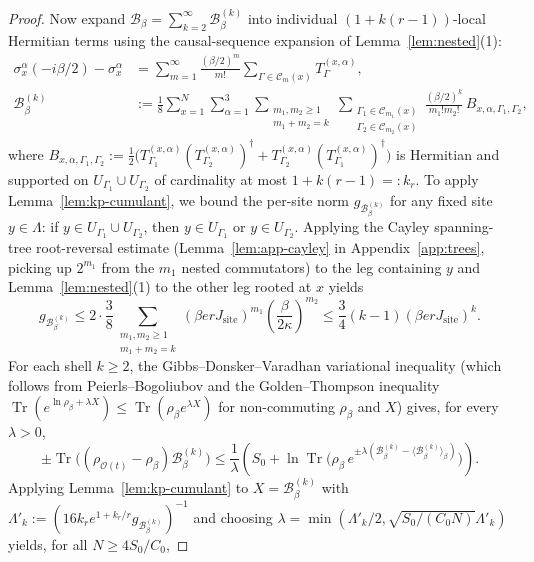 \documentclass[11pt,a4paper]{article}
\numberwithin{equation}{section}
\theoremstyle{plain}
\theoremstyle{definition}
\newcommand{\Tr}{\operatorname{Tr}}
\begin{document}
\begin{proof}
Now expand $\mathcal{B}_\beta = \sum_{k=2}^\infty \mathcal{B}_\beta^{(k)}$ into individual $(1+k(r-1))$-local Hermitian terms using the causal-sequence expansion of Lemma~\ref{lem:nested}(1):
\begin{align*}
  \sigma_x^\alpha(-i\beta/2) - \sigma_x^\alpha &= \sum_{m=1}^\infty \frac{(\beta/2)^m}{m!}\sum_{\Gamma\in\mathcal{C}_m(x)} T_\Gamma^{(x,\alpha)}, \\
  \mathcal{B}_\beta^{(k)} &:= \frac{1}{8}\sum_{x=1}^N\sum_{\alpha=1}^3 \sum_{\substack{m_1,m_2\ge 1\\ m_1+m_2=k}} \sum_{\substack{\Gamma_1\in\mathcal{C}_{m_1}(x)\\ \Gamma_2\in\mathcal{C}_{m_2}(x)}} \frac{(\beta/2)^k}{m_1!m_2!}\,B_{x,\alpha,\Gamma_1,\Gamma_2},
\end{align*}
where $B_{x,\alpha,\Gamma_1,\Gamma_2} := \frac{1}{2}\bigl(T_{\Gamma_1}^{(x,\alpha)}(T_{\Gamma_2}^{(x,\alpha)})^\dagger + T_{\Gamma_2}^{(x,\alpha)}(T_{\Gamma_1}^{(x,\alpha)})^\dagger\bigr)$ is Hermitian and supported on $U_{\Gamma_1}\cup U_{\Gamma_2}$ of cardinality at most $1 + k(r-1) =: k_r$. To apply Lemma~\ref{lem:kp-cumulant}, we bound the per-site norm $g_{\mathcal{B}_\beta^{(k)}}$ for any fixed site $y\in\Lambda$: if $y\in U_{\Gamma_1}\cup U_{\Gamma_2}$, then $y\in U_{\Gamma_1}$ or $y\in U_{\Gamma_2}$. Applying the Cayley spanning-tree root-reversal estimate (Lemma~\ref{lem:app-cayley} in Appendix~\ref{app:trees}, picking up $2^{m_1}$ from the $m_1$ nested commutators) to the leg containing $y$ and Lemma~\ref{lem:nested}(1) to the other leg rooted at $x$ yields
\[
  g_{\mathcal{B}_\beta^{(k)}} \le 2\cdot\frac{3}{8}\sum_{\substack{m_1,m_2\ge 1\\ m_1+m_2=k}} (\beta e r J_{\mathrm{site}})^{m_1}\left(\frac{\beta}{2\kappa}\right)^{m_2}
  \le \frac{3}{4}(k-1)(\beta e r J_{\mathrm{site}})^k.
\]
For each shell $k\ge 2$, the Gibbs--Donsker--Varadhan variational inequality (which follows from Peierls--Bogoliubov and the Golden--Thompson inequality $\Tr(e^{\ln\rho_\beta + \lambda X}) \le \Tr(\rho_\beta e^{\lambda X})$ for non-commuting $\rho_\beta$ and $X$) gives, for every $\lambda > 0$,
\begin{equation}\label{eq:gdv}
  \pm\Tr\!\bigl((\rho_{\mathcal{O}(t)}-\rho_\beta)\mathcal{B}_\beta^{(k)}\bigr)
  \le \frac{1}{\lambda}\left(S_0 + \ln\Tr\!\bigl(\rho_\beta\,e^{\pm\lambda(\mathcal{B}_\beta^{(k)}-\langle\mathcal{B}_\beta^{(k)}\rangle_\beta)}\bigr)\right).
\end{equation}
Applying Lemma~\ref{lem:kp-cumulant} to $X = \mathcal{B}_\beta^{(k)}$ with $\Lambda'_k := (16 k_r e^{1+k_r/r} g_{\mathcal{B}_\beta^{(k)}})^{-1}$ and choosing $\lambda = \min(\Lambda'_k/2, \sqrt{S_0/(C_0 N)}\Lambda'_k)$ yields, for all $N\ge 4S_0/C_0$,

\end{proof}
\end{document}
